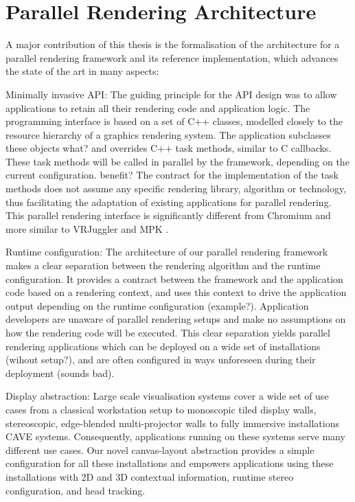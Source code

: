 \section{Parallel Rendering Architecture}

A major contribution of this thesis is the formalisation of the architecture for
a parallel rendering framework and its reference implementation, which advances
the state of the art in many aspects:

\begin{compactdesc}

\item[Minimally invasive API:] The guiding principle for the API design was to
allow applications to retain all their rendering code and application logic.
The programming interface is based on a set of C++ classes, modelled closely to
the resource hierarchy of a graphics rendering system. The application
subclasses these objects what? and overrides C++ task methods, similar to C
callbacks. These task methods will be called in parallel by the framework,
depending on the current configuration. benefit? The contract for the implementation of
the task methods does not assume any specific rendering library, algorithm or
technology, thus facilitating the adaptation of existing applications for
parallel rendering. This parallel rendering interface is significantly
different from Chromium \cite{HHNFAKK:02} and more similar to VRJuggler
\cite{BJHMBC:01} and MPK \cite{BRE:05}.

\item[Runtime configuration:] The architecture of our parallel rendering
framework makes a clear separation between the rendering algorithm and the runtime
configuration. It provides a contract between the framework and the application
code based on a rendering context, and uses this context to drive the
application output depending on the runtime configuration (example?). Application
developers are unaware of parallel rendering setups and make no assumptions on
how the rendering code will be executed. This clear separation yields parallel
rendering applications which can be deployed on a wide set of installations (wihout setup?),
and are often configured in ways unforeseen during their deployment (sounds bad).

\item[Display abstraction:] Large scale visualisation systems cover a wide set
of use cases from a classical workstation setup to monoscopic tiled display
walls, stereoscopic, edge-blended multi-projector walls to fully immersive
installations CAVE systems. Consequently, applications running on these
systems serve many different use cases. Our novel canvas-layout
abstraction provides a simple configuration for all these installations and
empowers applications using these installations with 2D and 3D contextual
information, runtime stereo configuration, and head tracking.


\end{compactdesc}
